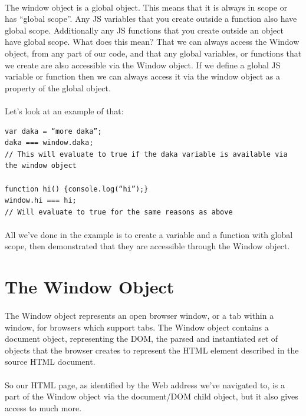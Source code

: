 \paragraph{} The window object is a global object. This means that it is always in scope or has “global scope”. Any JS variables that you create outside a function also have global scope. Additionally any JS functions that you create outside an object have global scope. What does this mean? That we can always access the Window object, from any part of our code, and that any global variables, or functions that we create are also accessible via the Window object. If we define a global JS variable or function then we can always access it via the window object as a property of the global object.
\paragraph{} Let's look at an example of that:

\begin{lstlisting}
var daka = “more daka”;
daka === window.daka;
// This will evaluate to true if the daka variable is available via the window object

function hi() {console.log(“hi”);}
window.hi === hi;
// Will evaluate to true for the same reasons as above
\end{lstlisting}

\paragraph{} All we've done in the example is to create a variable and a function with global scope, then demonstrated that they are accessible through the Window object.


\section{The Window Object}
\paragraph{} The Window object represents an open browser window, or a tab within a window, for browsers which support tabs. The Window object contains a document object, representing the DOM, the parsed and instantiated set of objects that the browser creates to represent the HTML element described in the source HTML document.
\paragraph{} So our HTML page, as identified by the Web address we've navigated to, is a part of the Window object via the document/DOM child object, but it also gives access to much more.
